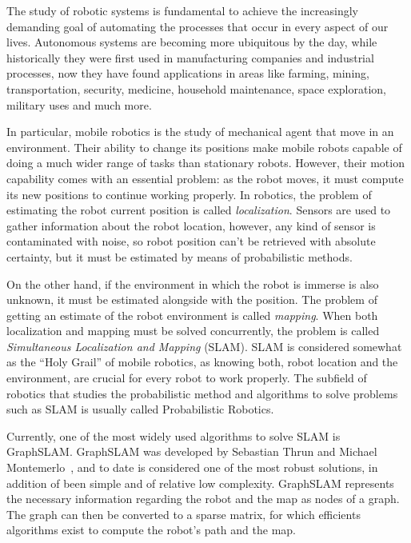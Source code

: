 The study of robotic systems is fundamental to achieve the increasingly demanding goal of automating the processes that occur in every aspect of our lives. Autonomous systems are becoming more ubiquitous by the day, while historically they were first used in manufacturing companies and industrial processes, now they have found applications in areas like farming, mining, transportation, security, medicine, household maintenance, space exploration, military uses and much more.

In particular, mobile robotics is the study of mechanical agent that move in an environment. Their ability to change its positions make mobile robots capable of doing a much wider range of tasks than stationary robots. However, their motion capability comes with an essential problem: as the robot moves, it must compute its new positions to continue working properly. In robotics, the problem of estimating the robot current position is called \textit{localization}. Sensors are used to gather information about the robot location, however, any kind of sensor is contaminated with noise, so robot position can't be retrieved with absolute certainty, but it must be estimated by means of probabilistic methods.  


On the other hand, if the environment in which the robot is immerse is also unknown, it must be estimated alongside with the position. The problem of getting an estimate of the robot environment is called \textit{mapping}. When both localization and mapping must be solved concurrently, the problem is called \textit{Simultaneous Localization and Mapping} (SLAM). SLAM is considered somewhat as the ``Holy Grail'' of mobile robotics, as knowing both, robot location and the environment, are crucial for every robot to work properly. The subfield of robotics that studies the probabilistic method and algorithms to solve problems such as SLAM is usually called Probabilistic Robotics.

Currently, one of the most widely used algorithms to solve SLAM is GraphSLAM. GraphSLAM was developed by Sebastian Thrun and Michael Montemerlo~\cite{graphslam}, and to date is considered one of the most robust solutions, in addition of been simple and of relative low complexity. GraphSLAM represents the necessary information regarding the robot and the map as nodes of a graph. The graph can then be converted to a sparse matrix, for which efficients algorithms exist to compute the robot's path and the map. 


